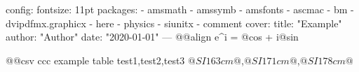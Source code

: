config:
  fontsize: 11pt
  packages:
    - amsmath
    - amssymb
    - amsfonts
    - ascmac
    - bm
    - dvipdfmx.graphicx
    - here
    - physics
    - siunitx
    - comment
cover:
  title: "Example"
  author: "Author"
  date: "2020-01-01"
---
@@align
e^{i\pi} = @cos \pi@ + i@sin 


@@csv ccc
example table
test1,test2,test3
$@SI 163 cm@$,$@SI 171 cm@$,$@SI 178 cm@$
